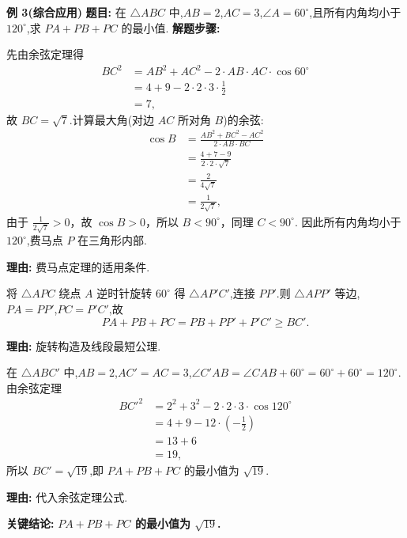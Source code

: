 \begin{examplebox}
	\medskip
	\textbf{\textcolor{CExample}{例 3(综合应用)}}
	\textbf{\textcolor{CExample}{题目:}}
	在 $\triangle ABC$ 中,$AB=2$,$AC=3$,$\angle A = 60^\circ$,且所有内角均小于 $120^\circ$,求 $PA+PB+PC$ 的最小值.
	\textbf{\textcolor{CExample}{解题步骤:}}
	\begin{description}[style=nextline, leftmargin=2.8em, labelsep=0.5em, itemsep=0.45em]
		\item[\textbf{第一步(条件验证):}]
			先由余弦定理得
			\[
				\begin{aligned}
					BC^2 &= AB^2+AC^2-2\cdot AB\cdot AC\cdot\cos60^\circ \\ &= 4+9-2\cdot2\cdot3\cdot\frac12 \\ &= 7,
			\end{aligned}
			\]
			故 $BC=\sqrt7$.计算最大角(对边 $AC$ 所对角 $B$)的余弦:
			\[
				\begin{aligned}
					\cos B &= \frac{AB^2+BC^2-AC^2}{2\cdot AB\cdot BC} \\ &= \frac{4+7-9}{2\cdot2\cdot\sqrt7} \\ &= \frac{2}{4\sqrt7} \\ &= \frac1{2\sqrt7},
			\end{aligned}
			\]
			由于 $\frac1{2\sqrt7}>0$，故 $\cos B>0$，所以 $B<90^\circ$，同理 $C<90^\circ$. 因此所有内角均小于 $120^\circ$,费马点 $P$ 在三角形内部.
			\par\textbf{理由:} 费马点定理的适用条件.
		\item[\textbf{第二步(旋转转化):}]
			将 $\triangle APC$ 绕点 $A$ 逆时针旋转 $60^\circ$ 得 $\triangle AP'C'$,连接 $PP'$.则 $\triangle APP'$ 等边,$PA=PP'$,$PC=P'C'$,故
			\[
				PA+PB+PC = PB+PP'+P'C' \ge BC'.
			\]
			\par\textbf{理由:} 旋转构造及线段最短公理.
		\item[\textbf{第三步(计算 $BC'$):}]
			在 $\triangle ABC'$ 中,$AB=2$,$AC'=AC=3$,$\angle C'AB = \angle CAB + 60^\circ = 60^\circ+60^\circ=120^\circ$.由余弦定理
			\[
				\begin{aligned}
					BC'^2 &= 2^2+3^2-2\cdot2\cdot3\cdot\cos120^\circ \\ &= 4+9-12\cdot\left(-\frac12\right) \\ &= 13+6 \\ &= 19,
			\end{aligned}
			\]
			所以 $BC' = \sqrt{19}$,即 $PA+PB+PC$ 的最小值为 $\sqrt{19}$.
			\par\textbf{理由:} 代入余弦定理公式.
	\end{description}
	\textbf{\textcolor{CExample}{关键结论:}}
	\textbf{$PA+PB+PC$ 的最小值为 $\sqrt{19}$.}
\end{examplebox}
